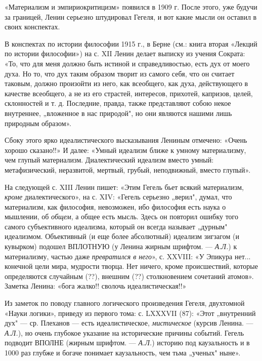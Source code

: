 «Материализм и эмпириокритицизм»  появился в 1909 г.  После этого, уже
будучи  за границей,  Ленин серьезно  штудировал Гегеля,  и вот  какие
мысли он оставил в своих конспектах.

В  конспектах  по истории  философии  1915  г.,  в Берне  (см.:  книга
вторая  «Лекций  по  истории  философии»)   на  с.  XII  Ленин  делает
выписку из  учения Сократа: «То,  что для  меня должно быть  истиной и
справедливостью, есть дух от моего духа.  Но то, что дух таким образом
творит из  самого себя,  что он считает  таковым, должно  произойти из
него, как всеобщего, как духа, действующего в качестве всеобщего, а не
из его  страстей, интересов, прихотей, капризов,  целей, склонностей и
т. д.  Последние, правда,  также представляют собою  некое внутреннее,
„вложенное  в нас  природой", но  они являются  нашими лишь  природным
образом».

Сбоку  этого  ярко  идеалистического  высказывания  Лениным  отмечено:
«Очень  хорошо сказано!!»  И  далее: «Умный  идеализм  ближе к  умному
материализму, чем  глупый материализм. Диалектический  идеализм вместо
умный:  метафизический,  неразвитой,   мертвый,  грубый,  неподвижный,
вместо глупый».

На  следующей   с.  XIII  Ленин   пишет:  «Этим  Гегель   бьет  всякий
материализм,  \emph{кроме}   диалектического»,  на  с.   XIV:  «Гегель
серьезно „верил",  думал, что материализм, как  философия, невозможен,
ибо философия  есть наука  о мышлении, об  \emph{общем}, а  общее есть
мысль. Здесь  он повторил ошибку того  самого субъективного идеализма,
который  он всегда  называет „дурным"  идеализмом. Объективный  (и еще
более абсолютный)  идеализм зигзагом (и кувырком)  подошел ВПЛОТНУЮ (у
Ленина жирным  шрифтом. ---  \emph{А.Л.}) к материализму,  частью даже
\emph{превратился  в него}»,  с.  XXVIII: «У  Эпикура нет...  конечной
цели мира,  мудрости творца.  Нет ничего, кроме  происшествий, которые
определяются  случайным  (??),  внешним (??)  столкновением  сочетаний
атомов». Заметка Ленина: «бога жалко!! сволочь идеалистическая!!»

Из  заметок  по  поводу   главного  логического  произведения  Гегеля,
двухтомной «Науки логики»,  приведу из первого тома:  с. LXXXVII (87):
«Этот  „внутренний дух"  ---  ср. Плеханов  --- есть  идеалистическое,
\emph{мистическое} (курсив Ленина. --- \emph{А.Л.}), но очень глубокое
указание  на  исторические  причины событий.  Гегель  подводит  ВПОЛНЕ
(жирным шрифтом.  --- \emph{А.Л.}) историю  под каузальность и  в 1000
раз глубже и богаче понимает каузальность, чем тьма „ученых" ныне».

